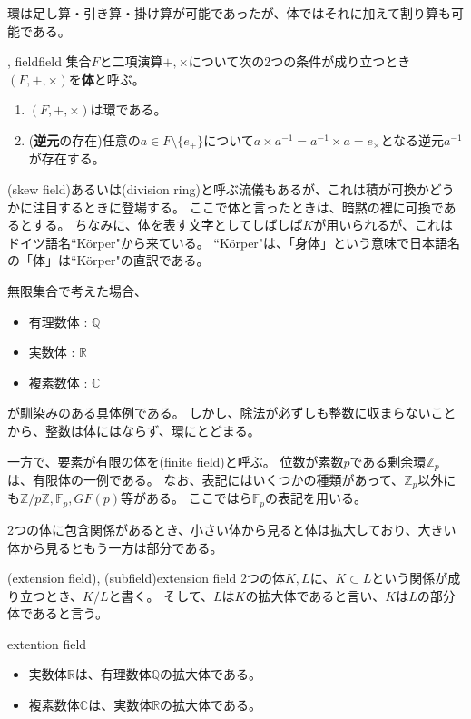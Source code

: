 環は足し算・引き算・掛け算が可能であったが、体ではそれに加えて割り算も可能である。

\begin{Defi}{, field}{field}
集合$F$と二項演算$+,\times$について次の2つの条件が成り立つとき$(F,+,\times)$を\textbf{体}と呼ぶ。
\begin{enumerate}
 \item $(F,+,\times)$は環である。
 \item (\textbf{逆元}の存在)任意の$a\in{F}\setminus\{e_{+}\}$について$a{\times}a^{-1}=a^{-1}{\times}a=e_{\times}$となる逆元$a^{-1}$が存在する。
\end{enumerate}
\end{Defi}

(skew field)あるいは(division ring)と呼ぶ流儀もあるが、これは積が可換かどうかに注目するときに登場する。
ここで体と言ったときは、暗黙の裡に可換であるとする。
ちなみに、体を表す文字としてしばしば$K$が用いられるが、これはドイツ語名``Körper"から来ている。
``Körper"は、「身体」という意味で日本語名の「体」は``Körper"の直訳である。

無限集合で考えた場合、
\begin{itemize}
 \item 有理数体 : $\mathbb{Q}$
 \item 実数体 : $\mathbb{R}$
 \item 複素数体 : $\mathbb{C}$
\end{itemize}
が馴染みのある具体例である。
しかし、除法が必ずしも整数に収まらないことから、整数は体にはならず、環にとどまる。

一方で、要素が有限の体を(finite field)と呼ぶ。
位数が素数$p$である剰余環$\mathbb{Z}_p$は、有限体の一例である。
なお、表記にはいくつかの種類があって、$\mathbb{Z}_p$以外にも$\mathbb{Z}/p\mathbb{Z}, \mathbb{F}_p, GF(p)$等がある。
ここではら$\mathbb{F}_p$の表記を用いる。

2つの体に包含関係があるとき、小さい体から見ると体は拡大しており、大きい体から見るともう一方は部分である。

\begin{Defi}{(extension field), (subfield)}{extension field}
2つの体$K, L$に、$K\subset L$という関係が成り立つとき、$K/L$と書く。
そして、$L$は$K$の拡大体であると言い、$K$は$L$の部分体であると言う。
\end{Defi}

\begin{Exam}{}{extention field}\;
\begin{itemize}
 \item 実数体$\mathbb{R}$は、有理数体$\mathbb{Q}$の拡大体である。
 \item 複素数体$\mathbb{C}$は、実数体$\mathbb{R}$の拡大体である。
\end{itemize}
\end{Exam}

